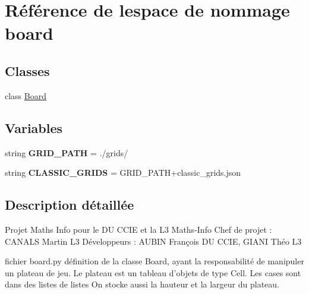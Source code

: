 \hypertarget{namespaceboard}{}\section{Référence de l\textquotesingle{}espace de nommage board}
\label{namespaceboard}
\subsection*{Classes}
\begin{DoxyCompactItemize}
\item 
class \hyperlink{classboard_1_1Board}{Board}
\end{DoxyCompactItemize}
\subsection*{Variables}
\begin{DoxyCompactItemize}
\item 
\mbox{\label{namespaceboard_a392142c03752b1fc852753f51870b318}} 
string {\bfseries G\+R\+I\+D\+\_\+\+P\+A\+TH} = \textquotesingle{}./grids/\textquotesingle{}
\item 
\mbox{\label{namespaceboard_abaffb7ebc64518a042940113d687495a}} 
string {\bfseries C\+L\+A\+S\+S\+I\+C\+\_\+\+G\+R\+I\+DS} = G\+R\+I\+D\+\_\+\+P\+A\+TH+\textquotesingle{}classic\+\_\+grids.\+json\textquotesingle{}
\end{DoxyCompactItemize}


\subsection{Description détaillée}
\begin{DoxyVerb}Projet Maths Info pour le DU CCIE et la L3 Maths-Info
Chef de projet : CANALS Martin L3
Développeurs : AUBIN François DU CCIE, GIANI Théo L3

fichier board.py 
définition de la classe Board, ayant la responsabilité de manipuler un plateau de jeu.
Le plateau est un tableau d'objets de type Cell.
    Les cases sont dans des listes de listes
    On stocke aussi la hauteur et la largeur du plateau.
\end{DoxyVerb}
 
